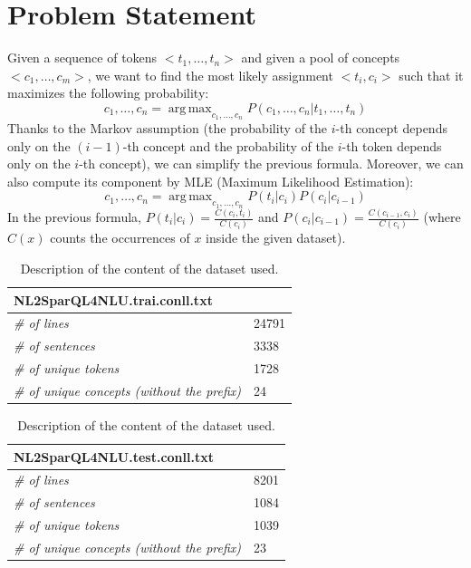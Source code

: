 \documentclass[11pt,a4paper]{article}
\DeclareMathOperator*{\argmax}{arg\,max}
\begin{document}
\section{Problem Statement}
Given a sequence of tokens $<t_1, \ldots, t_n>$ and given a pool of concepts $<c_1, \ldots, c_m>$, we want to find the most likely assignment $<t_i, c_i>$ such that it maximizes the following probability:
\begin{equation}
c_1, \ldots, c_n = \argmax_{c_1, \ldots, c_n} P (c_1, \ldots, c_n | t_1, \ldots, t_n)
\label{frm:argmax}
\end{equation}
Thanks to the Markov assumption (the probability of the $i$-th concept depends only on the $(i-1)$-th concept and the probability of the $i$-th token depends only on the $i$-th concept), we can simplify the previous formula. Moreover, we can also compute its component by MLE (Maximum Likelihood Estimation):
\begin{equation}
c_1, \ldots, c_n = \argmax_{c_1, \ldots, c_n} P(t_i|c_i)P(c_i| c_{i-1})
\label{frm:argmax-markov-assumption}
\end{equation}
In the previous formula, $P(t_i|c_i) = \frac{C(c_i, t_i)}{C(c_i)}$ and $P(c_i|c_{i-1}) = \frac{C(c_{i-1}, c_i)}{C(c_i)}$ (where $C(x)$ counts the occurrences of $x$ inside the given dataset). 

\begin{table}
    \begin{subtable}{.5\linewidth}
		\centering
\begin{tabular}{|l|l|}
\hline
\multicolumn{2}{|l|}{\textbf{NL2SparQL4NLU.trai.conll.txt}} \\ \hline
\textit{\# of lines}									& 24791 \\ \hline
\textit{\# of sentences}                             & 3338 \\ \hline
\textit{\# of unique tokens}                         & 1728 \\ \hline
\textit{\# of unique concepts (without the prefix)}  & 24   \\ \hline
\end{tabular}
\caption{Train dataset.}
\end{subtable}%
\begin{subtable}{.5\linewidth}
\centering
\begin{tabular}{|l|l|}
\hline
\multicolumn{2}{|l|}{\textbf{NL2SparQL4NLU.test.conll.txt}} \\ \hline
\textit{\# of lines}									& 8201 \\ \hline
\textit{\# of sentences}                             & 1084 \\ \hline
\textit{\# of unique tokens}                         & 1039 \\ \hline
\textit{\# of unique concepts (without the prefix)}  & 23   \\ \hline
\end{tabular}
\caption{Test dataset.}
\label{tab:test-dataset-description}
\end{subtable}
\caption{Description of the content of the dataset used.}
\end{table} 
\end{document}
